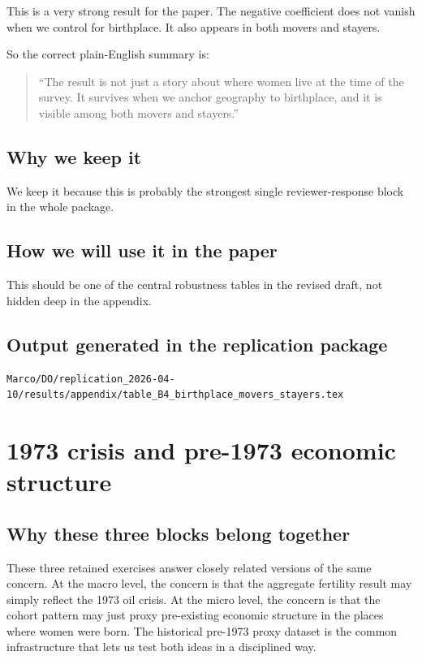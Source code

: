 \documentclass[11pt]{article}
\begin{document}
This is a very strong result for the paper. The negative coefficient does not vanish when we control for birthplace. It also appears in both movers and stayers.

So the correct plain-English summary is:

\begin{quote}
``The result is not just a story about where women live at the time of the survey. It survives when we anchor geography to birthplace, and it is visible among both movers and stayers.''
\end{quote}

\subsection*{Why we keep it}

We keep it because this is probably the strongest single reviewer-response block in the whole package.

\subsection*{How we will use it in the paper}

This should be one of the central robustness tables in the revised draft, not hidden deep in the appendix.

\subsection*{Output generated in the replication package}

\begin{verbatim}
Marco/DO/replication_2026-04-10/results/appendix/table_B4_birthplace_movers_stayers.tex
\end{verbatim}

\section{1973 crisis and pre-1973 economic structure}\label{sec:oilshock}

\subsection*{Why these three blocks belong together}

These three retained exercises answer closely related versions of the same concern. At the macro level, the concern is that the aggregate fertility result may simply reflect the 1973 oil crisis. At the micro level, the concern is that the cohort pattern may just proxy pre-existing economic structure in the places where women were born. The historical pre-1973 proxy dataset is the common infrastructure that lets us test both ideas in a disciplined way.
\end{document}
